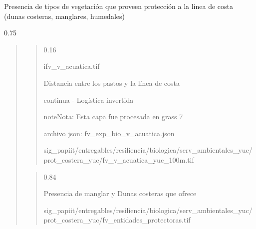 \documentclass[letterpaper,10pt,spanish]{sphinxmanual}
\begin{document}

Presencia de tipos de vegetación que proveen protección a la línea de costa (dunas costeras, manglares, humedales)


 0.75

\begin{quote}

\begin{quote}


 0.16

 ifv\_v\_acuatica.tif

 Distancia entre los pastos y la línea de costa

 continua - Logística invertida

\begin{sphinxadmonition}{note}{Nota:}
Esta capa fue procesada en grass 7
\end{sphinxadmonition}

archivo json: fv\_exp\_bio\_v\_acuatica.json


\noindent{}

 sig\_papiit/entregables/resiliencia/biologica/serv\_ambientales\_yuc/prot\_costera\_yuc/fv\_v\_acuatica\_yuc\_100m.tif
\end{quote}

\begin{quote}

 0.84

 Presencia de manglar y Dunas costeras que ofrece

 sig\_papiit/entregables/resiliencia/biologica/serv\_ambientales\_yuc/prot\_costera\_yuc/fv\_entidades\_protectoras.tif

\noindent{}
\end{quote}
\end{quote}
\end{document}
